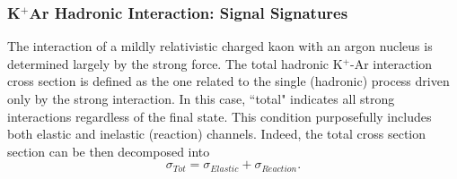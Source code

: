 



\subsubsection{K$^{+}$Ar Hadronic Interaction: Signal Signatures}\label{sec:KSignalSignature}
The interaction of a mildly relativistic charged kaon with an argon nucleus is determined largely by the strong force. The total hadronic K$^{+}$-Ar interaction cross section is defined as the one related to the single (hadronic) process driven only by the strong interaction.
In this case, ``total" indicates all strong interactions regardless of the final state. This condition purposefully includes both elastic and inelastic (reaction) channels. Indeed, the total cross section section can be then decomposed into
$$\sigma_{Tot} = \sigma_{Elastic}+ \sigma_{Reaction}.$$



